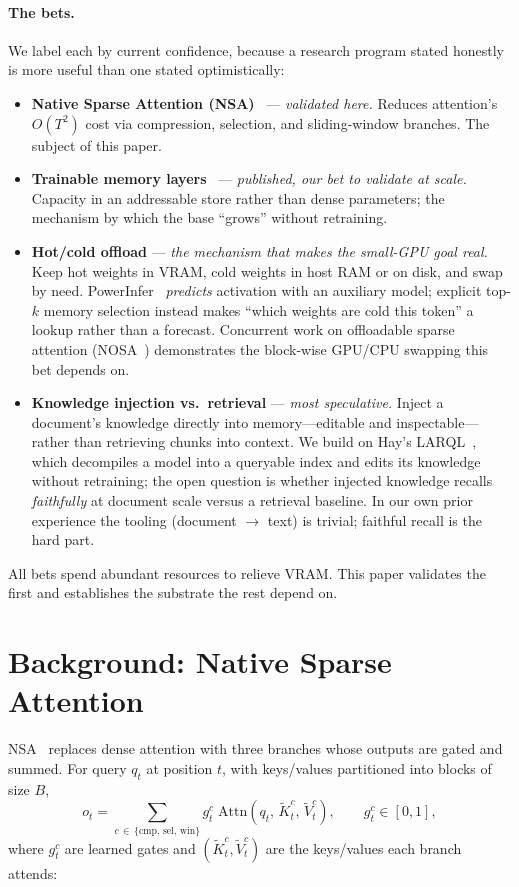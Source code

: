 \documentclass[11pt]{article}
\begin{document}
\paragraph{The bets.} We label each by current confidence, because a research program stated
honestly is more useful than one stated optimistically:
\begin{itemize}[leftmargin=1.2em,itemsep=2pt]
\item \textbf{Native Sparse Attention (NSA)}~\cite{nsa} --- \emph{validated here.} Reduces
attention's $O(T^2)$ cost via compression, selection, and sliding-window branches. The subject of
this paper.
\item \textbf{Trainable memory layers}~\cite{memlayers} --- \emph{published, our bet to validate at
scale.} Capacity in an addressable store rather than dense parameters; the mechanism by which the
base ``grows'' without retraining.
\item \textbf{Hot/cold offload} --- \emph{the mechanism that makes the small-GPU goal real.} Keep
hot weights in VRAM, cold weights in host RAM or on disk, and swap by need. PowerInfer~\cite{powerinfer}
\emph{predicts} activation with an auxiliary model; explicit top-$k$ memory selection instead makes
``which weights are cold this token'' a lookup rather than a forecast. Concurrent work on
offloadable sparse attention (NOSA~\cite{nosa}) demonstrates the block-wise GPU/CPU swapping this
bet depends on.
\item \textbf{Knowledge injection vs.\ retrieval} --- \emph{most speculative.} Inject a document's
knowledge directly into memory---editable and inspectable---rather than retrieving chunks into
context. We build on Hay's LARQL~\cite{larql}, which decompiles a model into a queryable index and
edits its knowledge without retraining; the open question is whether injected knowledge recalls
\emph{faithfully} at document scale versus a retrieval baseline. In our own prior experience the
tooling (document $\to$ text) is trivial; faithful recall is the hard part.
\end{itemize}
All bets spend abundant resources to relieve VRAM. This paper validates the first and establishes
the substrate the rest depend on.

\section{Background: Native Sparse Attention}
\label{sec:background}
NSA~\cite{nsa} replaces dense attention with three branches whose outputs are gated and summed.
For query $q_t$ at position $t$, with keys/values partitioned into blocks of size $B$,
\begin{equation}
o_t = \sum_{c\,\in\,\{\mathrm{cmp},\,\mathrm{sel},\,\mathrm{win}\}} g_t^{c}\;\mathrm{Attn}\!\left(q_t,\,\tilde{K}_t^{c},\,\tilde{V}_t^{c}\right),
\qquad g_t^{c}\in[0,1],
\end{equation}
where $g_t^{c}$ are learned gates and $(\tilde{K}_t^{c},\tilde{V}_t^{c})$ are the keys/values each
branch attends:
\end{document}
